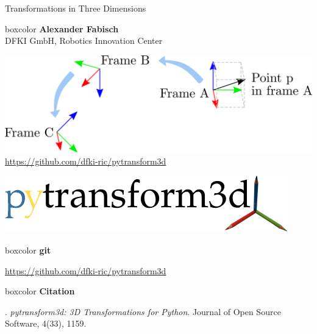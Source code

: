 \documentclass[14pt]{beamer}
\begin{document}
\begin{frame}
\begin{center}
{Transformations in Three Dimensions\par}
\vfill

\begin{beamercolorbox}[sep=0.5em,center]{boxcolor}
\textbf{Alexander Fabisch}\\
DFKI GmbH, Robotics Innovation Center
\end{beamercolorbox}

\vfill
\includegraphics[width=\textwidth]{images/transformation_modeling}
\vfill
\url{https://github.com/dfki-ric/pytransform3d}
\end{center}
\end{frame}

\begin{frame}
\includegraphics[width=\textwidth]{images/logo}
\begin{beamercolorbox}[wd=\textwidth,sep=1em]{boxcolor}
\textbf{git}

{\small \url{https://github.com/dfki-ric/pytransform3d}}
\end{beamercolorbox}



\begin{beamercolorbox}[wd=\textwidth,sep=1em]{boxcolor}
\textbf{Citation}

\textcite{Fabisch2019}. \textit{pytransform3d: 3D Transformations for Python}. Journal of Open Source Software, 4(33), 1159.
\end{beamercolorbox}
\end{frame}
\end{document}

